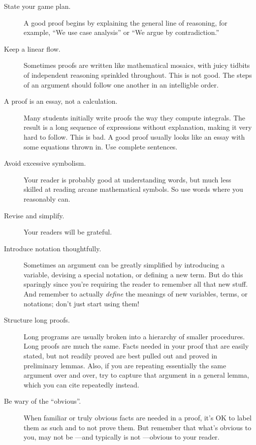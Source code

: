 \begin{description}

\item[State your game plan.]  A good proof begins by explaining the
  general line of reasoning, for example, ``We use case analysis'' or ``We
  argue by contradiction.''

\item[Keep a linear flow.]  Sometimes proofs are written like mathematical
  mosaics, with juicy tidbits of independent reasoning sprinkled
  throughout.  This is not good.  The steps of an argument should follow
  one another in an intelligble order.

\item[A proof is an essay, not a calculation.]  Many students initially
  write proofs the way they compute integrals.  The result is a long
  sequence of expressions without explanation, making it very hard to
  follow.  This is bad.  A good proof usually looks like an essay with
  some equations thrown in.  Use complete sentences.

\item[Avoid excessive symbolism.]  Your reader is probably good at
understanding words, but much less skilled at reading arcane
mathematical symbols.  So use words where you reasonably can.

\item[Revise and simplify.]  Your readers will be grateful.

\item[Introduce notation thoughtfully.]  Sometimes an argument can be
greatly simplified by introducing a variable, devising a special
notation, or defining a new term.  But do this sparingly since you're
requiring the reader to remember all that new stuff.  And remember to
actually \textit{define} the meanings of new variables, terms, or
notations; don't just start using them!

\item[Structure long proofs.]  Long programs are usually broken into a
hierarchy of smaller procedures.  Long proofs are much the same.
Facts needed in your proof that are easily stated, but not readily
proved are best pulled out and proved in preliminary lemmas.  Also, if
you are repeating essentially the same argument over and over, try to
capture that argument in a general lemma, which you can cite
repeatedly instead.

\item[Be wary of the ``obvious''.]  When familiar or truly obvious facts
  are needed in a proof, it's OK to label them as such and to not prove
  them.  But remember that what's obvious to you, may not be ---and
  typically is not ---obvious to your reader.


\end{description}
